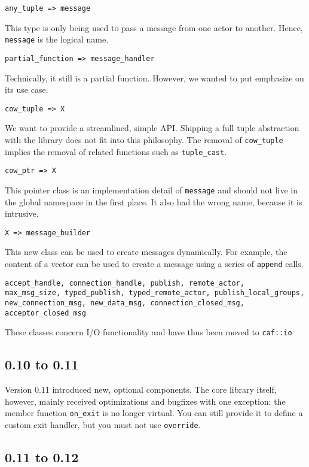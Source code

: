 \lstinline^any_tuple => message^

This type is only being used to pass a message from one actor to another.
Hence, \lstinline^message^ is the logical name.

\lstinline^partial_function => message_handler^

Technically, it still is a partial function. However, we wanted to put
emphasize on its use case.

\lstinline^cow_tuple => X^

We want to provide a streamlined, simple API. Shipping a full tuple abstraction
with the library does not fit into this philosophy. The removal of
\lstinline^cow_tuple^ implies the removal of related functions such as
\lstinline^tuple_cast^.

\lstinline^cow_ptr => X^

This pointer class is an implementation detail of \lstinline^message^ and
should not live in the global namespace in the first place. It also had the
wrong name, because it is intrusive.

\lstinline^X => message_builder^

This new class can be used to create messages dynamically. For example, the
content of a vector can be used to create a message using a series of
\lstinline^append^ calls.

\begin{lstlisting}
accept_handle, connection_handle, publish, remote_actor,
max_msg_size, typed_publish, typed_remote_actor, publish_local_groups,
new_connection_msg, new_data_msg, connection_closed_msg, acceptor_closed_msg
\end{lstlisting}

These classes concern I/O functionality and have thus been moved to
\lstinline^caf::io^

\subsection{0.10 to 0.11}

Version 0.11 introduced new, optional components. The core library itself,
however, mainly received optimizations and bugfixes with one exception: the
member function \lstinline^on_exit^ is no longer virtual. You can still provide
it to define a custom exit handler, but you must not use \lstinline^override^.

\subsection{0.11 to 0.12}

